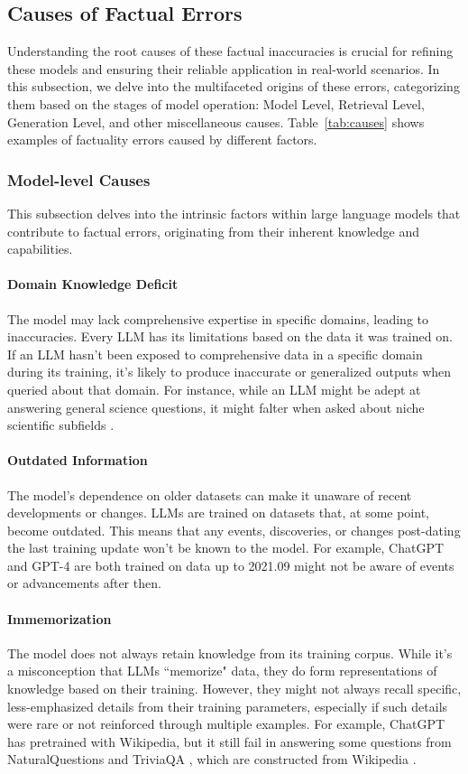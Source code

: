 \subsection{Causes of Factual Errors}
\label{sec:causes}
Understanding the root causes of these factual inaccuracies is crucial for refining these models and ensuring their reliable application in real-world scenarios. In this subsection, we delve into the multifaceted origins of these errors, categorizing them based on the stages of model operation: Model Level, Retrieval Level, Generation Level, and other miscellaneous causes. Table~\ref{tab:causes} shows examples of factuality errors caused by different factors.


\subsubsection{Model-level Causes}
\label{sec:model-causes}
This subsection delves into the intrinsic factors within large language models that contribute to factual errors, originating from their inherent knowledge and capabilities. 

\paragraph{Domain Knowledge Deficit} The model may lack comprehensive expertise in specific domains, leading to inaccuracies. Every LLM has its limitations based on the data it was trained on. If an LLM hasn't been exposed to comprehensive data in a specific domain during its training, it's likely to produce inaccurate or generalized outputs when queried about that domain. For instance, while an LLM might be adept at answering general science questions, it might falter when asked about niche scientific subfields \citep{ScienceQA}.

\paragraph{Outdated Information} The model's dependence on older datasets can make it unaware of recent developments or changes. LLMs are trained on datasets that, at some point, become outdated. This means that any events, discoveries, or changes post-dating the last training update won't be known to the model. For example, ChatGPT and GPT-4 are both trained on data up to 2021.09 might not be aware of events or advancements after then.

\paragraph{Immemorization} The model does not always retain knowledge from its training corpus. While it's a misconception that LLMs ``memorize" data, they do form representations of knowledge based on their training. However, they might not always recall specific, less-emphasized details from their training parameters, especially if such details were rare or not reinforced through multiple examples. For example, ChatGPT has pretrained with Wikipedia, but it still fail in answering some questions from NaturalQuestions \citep{NQ} and TriviaQA \citep{TQ}, which are constructed from Wikipedia \citep{wang2023evaluating}.

